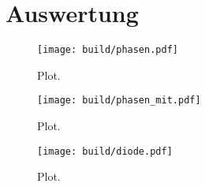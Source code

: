 \section{Auswertung}
\label{sec:Auswertung}

\begin{figure}
  \centering
  \texttt{[image: build/phasen.pdf]}
  \caption{Plot.}
  \label{fig:plot}
\end{figure}
\begin{figure}
  \centering
  \texttt{[image: build/phasen\_mit.pdf]}
  \caption{Plot.}
  \label{fig:plot2}
\end{figure}
\begin{figure}
  \centering
  \texttt{[image: build/diode.pdf]}
  \caption{Plot.}
  \label{fig:plot3}
\end{figure}


